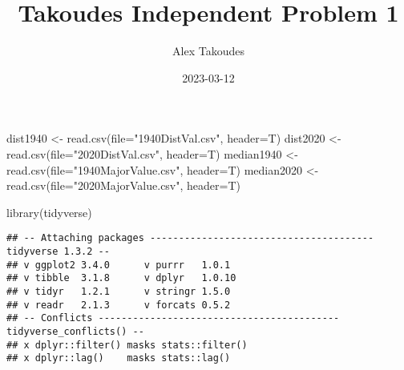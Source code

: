 \documentclass[
]{article}
\title{Takoudes Independent Problem 1}
\author{Alex Takoudes}
\date{2023-03-12}
\newenvironment{Shaded}{\begin{snugshade}}{\end{snugshade}}
\newcommand{\AttributeTok}[1]{\textcolor[rgb]{0.77,0.63,0.00}{#1}}
\newcommand{\FunctionTok}[1]{\textcolor[rgb]{0.00,0.00,0.00}{#1}}
\newcommand{\NormalTok}[1]{#1}
\newcommand{\OtherTok}[1]{\textcolor[rgb]{0.56,0.35,0.01}{#1}}
\newcommand{\StringTok}[1]{\textcolor[rgb]{0.31,0.60,0.02}{#1}}
\begin{document}
\maketitle

\begin{Shaded}
\begin{Highlighting}[]
\NormalTok{dist1940 }\OtherTok{\textless{}{-}} \FunctionTok{read.csv}\NormalTok{(}\AttributeTok{file=}\StringTok{"1940DistVal.csv"}\NormalTok{, }\AttributeTok{header=}\NormalTok{T)}
\NormalTok{dist2020 }\OtherTok{\textless{}{-}} \FunctionTok{read.csv}\NormalTok{(}\AttributeTok{file=}\StringTok{"2020DistVal.csv"}\NormalTok{, }\AttributeTok{header=}\NormalTok{T)}
\NormalTok{median1940 }\OtherTok{\textless{}{-}} \FunctionTok{read.csv}\NormalTok{(}\AttributeTok{file=}\StringTok{"1940MajorValue.csv"}\NormalTok{, }\AttributeTok{header=}\NormalTok{T)}
\NormalTok{median2020 }\OtherTok{\textless{}{-}} \FunctionTok{read.csv}\NormalTok{(}\AttributeTok{file=}\StringTok{"2020MajorValue.csv"}\NormalTok{, }\AttributeTok{header=}\NormalTok{T)}

\FunctionTok{library}\NormalTok{(tidyverse)}
\end{Highlighting}
\end{Shaded}

\begin{verbatim}
## -- Attaching packages --------------------------------------- tidyverse 1.3.2 --
## v ggplot2 3.4.0      v purrr   1.0.1 
## v tibble  3.1.8      v dplyr   1.0.10
## v tidyr   1.2.1      v stringr 1.5.0 
## v readr   2.1.3      v forcats 0.5.2 
## -- Conflicts ------------------------------------------ tidyverse_conflicts() --
## x dplyr::filter() masks stats::filter()
## x dplyr::lag()    masks stats::lag()
\end{verbatim}
\end{document}
